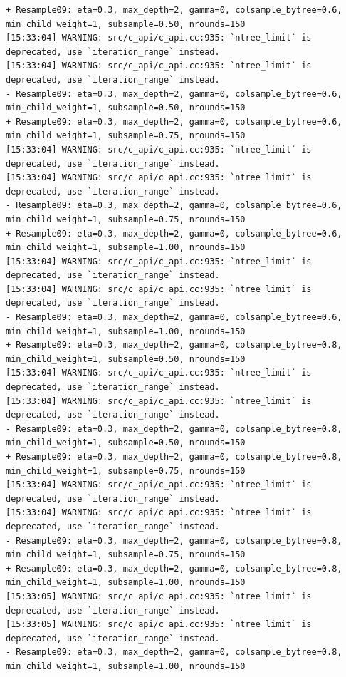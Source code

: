 \documentclass[
  letterpaper,
  DIV=11,
  numbers=noendperiod]{scrartcl}
\begin{document}
\begin{verbatim}
+ Resample09: eta=0.3, max_depth=2, gamma=0, colsample_bytree=0.6, min_child_weight=1, subsample=0.50, nrounds=150 
[15:33:04] WARNING: src/c_api/c_api.cc:935: `ntree_limit` is deprecated, use `iteration_range` instead.
[15:33:04] WARNING: src/c_api/c_api.cc:935: `ntree_limit` is deprecated, use `iteration_range` instead.
- Resample09: eta=0.3, max_depth=2, gamma=0, colsample_bytree=0.6, min_child_weight=1, subsample=0.50, nrounds=150 
+ Resample09: eta=0.3, max_depth=2, gamma=0, colsample_bytree=0.6, min_child_weight=1, subsample=0.75, nrounds=150 
[15:33:04] WARNING: src/c_api/c_api.cc:935: `ntree_limit` is deprecated, use `iteration_range` instead.
[15:33:04] WARNING: src/c_api/c_api.cc:935: `ntree_limit` is deprecated, use `iteration_range` instead.
- Resample09: eta=0.3, max_depth=2, gamma=0, colsample_bytree=0.6, min_child_weight=1, subsample=0.75, nrounds=150 
+ Resample09: eta=0.3, max_depth=2, gamma=0, colsample_bytree=0.6, min_child_weight=1, subsample=1.00, nrounds=150 
[15:33:04] WARNING: src/c_api/c_api.cc:935: `ntree_limit` is deprecated, use `iteration_range` instead.
[15:33:04] WARNING: src/c_api/c_api.cc:935: `ntree_limit` is deprecated, use `iteration_range` instead.
- Resample09: eta=0.3, max_depth=2, gamma=0, colsample_bytree=0.6, min_child_weight=1, subsample=1.00, nrounds=150 
+ Resample09: eta=0.3, max_depth=2, gamma=0, colsample_bytree=0.8, min_child_weight=1, subsample=0.50, nrounds=150 
[15:33:04] WARNING: src/c_api/c_api.cc:935: `ntree_limit` is deprecated, use `iteration_range` instead.
[15:33:04] WARNING: src/c_api/c_api.cc:935: `ntree_limit` is deprecated, use `iteration_range` instead.
- Resample09: eta=0.3, max_depth=2, gamma=0, colsample_bytree=0.8, min_child_weight=1, subsample=0.50, nrounds=150 
+ Resample09: eta=0.3, max_depth=2, gamma=0, colsample_bytree=0.8, min_child_weight=1, subsample=0.75, nrounds=150 
[15:33:04] WARNING: src/c_api/c_api.cc:935: `ntree_limit` is deprecated, use `iteration_range` instead.
[15:33:04] WARNING: src/c_api/c_api.cc:935: `ntree_limit` is deprecated, use `iteration_range` instead.
- Resample09: eta=0.3, max_depth=2, gamma=0, colsample_bytree=0.8, min_child_weight=1, subsample=0.75, nrounds=150 
+ Resample09: eta=0.3, max_depth=2, gamma=0, colsample_bytree=0.8, min_child_weight=1, subsample=1.00, nrounds=150 
[15:33:05] WARNING: src/c_api/c_api.cc:935: `ntree_limit` is deprecated, use `iteration_range` instead.
[15:33:05] WARNING: src/c_api/c_api.cc:935: `ntree_limit` is deprecated, use `iteration_range` instead.
- Resample09: eta=0.3, max_depth=2, gamma=0, colsample_bytree=0.8, min_child_weight=1, subsample=1.00, nrounds=150 

\end{verbatim}
\end{document}
